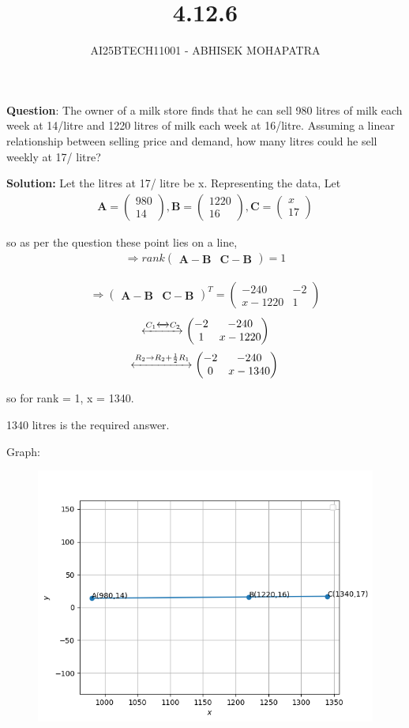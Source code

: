 \documentclass{beamer}
\title{4.12.6}
\author{AI25BTECH11001 - ABHISEK MOHAPATRA}
\theoremstyle{remark}
\newcommand{\myvec}[1]{\ensuremath{\begin{pmatrix}#1\end{pmatrix}}}
\let\vec\mathbf
\numberwithin{equation}{section}
\begin{document}
{\let\newpage\relax\maketitle}
\renewcommand{\thefigure}{\theenumi}
\renewcommand{\thetable}{\theenumi}


	 	\textbf{Question}:
The owner of a milk store finds that he can sell 980 litres of milk each week
at 14/litre and 1220 litres of milk each week at 16/litre. Assuming a linear
relationship between selling price and demand, how many litres could he sell weekly
at 17/ litre?

		\textbf{Solution:} 
Let the litres at 17/ litre be x.
Representing the data, Let
\begin{align}
\vec{A} = \myvec{980 \\ 14},
\vec{B} = \myvec{1220 \\ 16},
\vec{C} = \myvec{x \\ 17}
\end{align}

so as per the question these point lies on a line,
\begin{align}
	\Rightarrow rank\myvec{\vec{A}-\vec{B} & \vec{C}-\vec{B}} = 1 
\end{align}

\begin{align}
	\Rightarrow \myvec{\vec{A}-\vec{B} & \vec{C}-\vec{B}}^T = \myvec{-240 & -2 \\ x-1220 & 1} 
\end{align}
\begin{align}
	\xleftrightarrow[]{C_1\xleftrightarrow[]{} C_2} \myvec{-2 & -240 \\ 1 & x - 1220}
\end{align}
\begin{align}
	\xleftrightarrow[]{R_2\rightarrow R_2 + \frac{1}{2}R_1} \myvec{-2 & -240 \\ 0 & x - 1340}
\end{align}

so for rank = 1, x = 1340.

1340 litres is the required answer.


Graph:
\begin{figure}[h!]
	\centering
	\includegraphics[width=0.7\linewidth]{fig1.png}
\end{figure}
\end{document}
